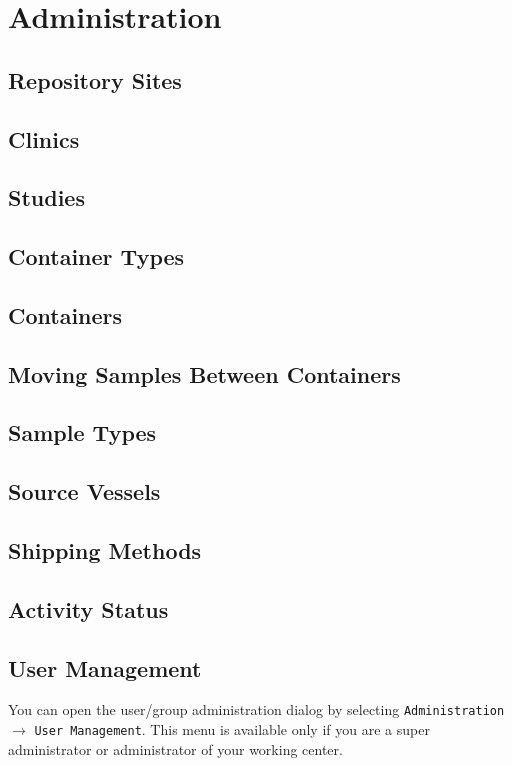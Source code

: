 \chapter{Administration}
\label{chap:administration}

\section{Repository Sites}
\section{Clinics}
\section{Studies}
\section{Container Types}
\section{Containers}
\section{Moving Samples Between Containers}
\section{Sample Types}
\section{Source Vessels}
\section{Shipping Methods}
\section{Activity Status}
\section{User Management}

You can open the user/group administration dialog by selecting
\texttt{Administration} $\to$ \texttt{User Management}.
This menu is available only if you are a super administrator or administrator 
of your working center. 

